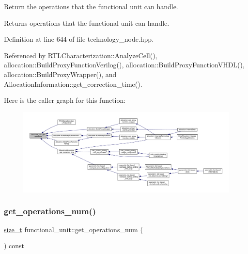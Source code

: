 Return the operations that the functional unit can handle. 

\begin{DoxyReturn}{Returns}
operations that the functional unit can handle. 
\end{DoxyReturn}


Definition at line 644 of file technology\+\_\+node.\+hpp.



Referenced by R\+T\+L\+Characterization\+::\+Analyze\+Cell(), allocation\+::\+Build\+Proxy\+Function\+Verilog(), allocation\+::\+Build\+Proxy\+Function\+V\+H\+D\+L(), allocation\+::\+Build\+Proxy\+Wrapper(), and Allocation\+Information\+::get\+\_\+correction\+\_\+time().

Here is the caller graph for this function\+:
\nopagebreak
\begin{figure}[H]
\begin{center}
\leavevmode
\includegraphics[width=350pt]{d8/dd6/structfunctional__unit_acf734bdfd3d41b4ce83ea6553b6ba051_icgraph}
\end{center}
\end{figure}
\mbox{\label{structfunctional__unit_a39929de3fd82d1665539576d738dfff0}} 
\subsubsection{\texorpdfstring{get\+\_\+operations\+\_\+num()}{get\_operations\_num()}}
{\footnotesize\ttfamily \hyperlink{tutorial__fpt__2017_2intro_2sixth_2test_8c_a7c94ea6f8948649f8d181ae55911eeaf}{size\+\_\+t} functional\+\_\+unit\+::get\+\_\+operations\+\_\+num (\begin{DoxyParamCaption}{ }\end{DoxyParamCaption}) const\hspace{0.3cm}{\ttfamily [inline]}}



